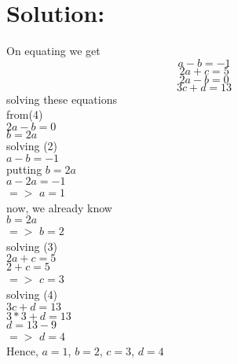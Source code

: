 \documentclass{article}
\begin{document}
\section*{Solution:}
On equating we get\\
\begin{equation}
    a-b=-1
\end{equation}
\begin{equation}
    2a+c=5
\end{equation}
\begin{equation}
    2a-b=0
\end{equation}
\begin{equation}
    3c+d=13
\end{equation}
solving these equations\\
from(4)\\
$2a-b=0$\\
$b=2a$\\
solving (2)\\
$a-b=-1$\\
putting $b=2a$\\
$a-2a=-1$\\
$=>$\hspace{2cm} $a=1$\\
now, we already know\\
$b=2a$\\
$=>$\hspace{2cm}  $b=2$\\

solving (3)\\
$2a+c=5$\\
$2+c=5$\\
$=>$\hspace{2cm}  $c=3$\\

solving (4)\\
$3c+d=13$\\
$3*3+d=13$\\
$d=13-9$\\
$=>$\hspace{2cm} $d=4$\\
Hence, $a=1$, $b=2$, $c=3$, $d=4$\\







    

    

    

    
\end{document}
